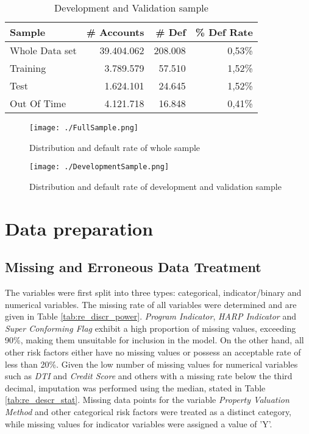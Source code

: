 \begin{table}[H]
\centering
\begin{tabular}{lrrr} \toprule       
\textbf{Sample} & \textbf{\# Accounts} & \textbf{\# Def} & \textbf{\% Def Rate} \\\midrule
Whole Data set   & 39.404.062           & 208.008         & 0,53\%               \\
Training        & 3.789.579            & 57.510          & 1,52\%               \\
Test            & 1.624.101            & 24.645          & 1,52\%               \\
Out Of Time     & 4.121.718            & 16.848          & 0,41\%               \\\bottomrule
\end{tabular}
\caption{Development and Validation sample}
\label{tab:re_devoofsample}
\end{table}

\begin{figure}[H]
	\centering
	\texttt{[image: ./FullSample.png]}
    \caption{Distribution and default rate of whole sample}
    \label{fig:re_wholesample}
\end{figure}
\begin{figure}[H]
	\centering
	\texttt{[image: ./DevelopmentSample.png]}
    \caption{Distribution and default rate of development and validation sample}
    \label{fig:re_devsample}
\end{figure}

\section{Data preparation}
\subsection{Missing and Erroneous Data Treatment}
The variables were first split into three types: categorical, indicator/binary and numerical variables. The missing rate of all variables were determined and are given in Table \ref{tab:re_discr_power}. \emph{Program Indicator}, \emph{HARP Indicator} and \emph{Super Conforming Flag} exhibit a high proportion of missing values, exceeding 90\%, making them unsuitable for inclusion in the model. On the other hand, all other risk factors either have no missing values or possess an acceptable rate of less than 20\%. Given the low number of missing values for numerical variables such as \emph{DTI} and \emph{Credit Score} and others with a missing rate below the third decimal, imputation was performed using the median, stated in Table \ref{tab:re_descr_stat}. Missing data points for the variable \emph{Property Valuation Method} and other categorical risk factors were treated as a distinct category, while missing values for indicator variables were assigned a value of 'Y'.

